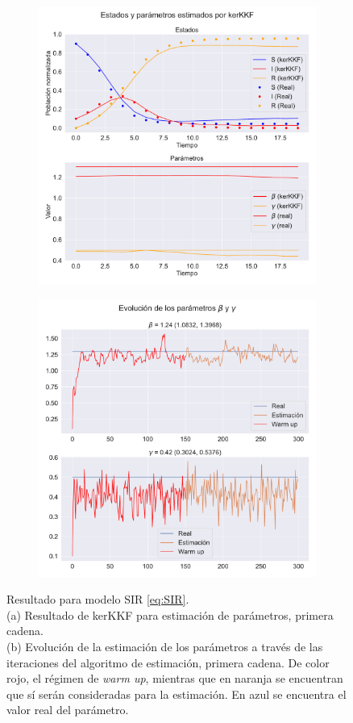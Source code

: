 \begin{figure}[h!]
    \centering
    \begin{subfigure}[b]{0.49\textwidth}
    \centering
         \includegraphics[width=0.8\linewidth]{img/content/chapter4/nonlinear_filters_sir_params.pdf}
    \caption{}
    \end{subfigure}
   \begin{subfigure}[b]{0.49\textwidth}
   \centering
       \includegraphics[width=0.8\linewidth]{img/content/chapter4/nonlinear_filters_sir_params_evolution.pdf}
       \caption{}
   \end{subfigure}
    \caption{Resultado para modelo SIR \eqref{eq:SIR}. \\
    (a) Resultado de kerKKF para estimación de parámetros, primera cadena. \\
    (b) Evolución de la estimación de los parámetros a través de las iteraciones del algoritmo de estimación, primera cadena. De color rojo, el régimen de \textit{warm up}, mientras que en naranja se encuentran que sí serán consideradas para la estimación. En azul se encuentra el valor real del parámetro.}
    \label{fig:param_estim_SIR}
\end{figure}

